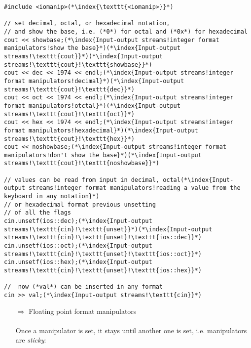 \documentclass[10pt]{article}
\begin{document}
\begin{lstlisting}
#include <iomanip>(*\index{\texttt{<iomanip>}}*)

// set decimal, octal, or hexadecimal notation,
// and show the base, i.e. (*0*) for octal and (*0x*) for hexadecimal
cout << showbase;(*\index{Input-output streams!integer format manipulators!show the base}*)(*\index{Input-output streams!\texttt{cout}}*)(*\index{Input-output streams!\texttt{cout}!\texttt{showbase}}*)
cout << dec << 1974 << endl;(*\index{Input-output streams!integer format manipulators!decimal}*)(*\index{Input-output streams!\texttt{cout}!\texttt{dec}}*)
cout << oct << 1974 << endl;(*\index{Input-output streams!integer format manipulators!otctal}*)(*\index{Input-output streams!\texttt{cout}!\texttt{oct}}*)
cout << hex << 1974 << endl;(*\index{Input-output streams!integer format manipulators!hexadecimal}*)(*\index{Input-output streams!\texttt{cout}!\texttt{hex}}*)
cout << noshowbase;(*\index{Input-output streams!integer format manipulators!don't show the base}*)(*\index{Input-output streams!\texttt{cout}!\texttt{noshowbase}}*)

// values can be read from input in decimal, octal(*\index{Input-output streams!integer format manipulators!reading a value from the keyboard in any notation}*)
// or hexadecimal format previous unsetting
// of all the flags
cin.unsetf(ios::dec);(*\index{Input-output streams!\texttt{cin}!\texttt{unset}}*)(*\index{Input-output streams!\texttt{cin}!\texttt{unset}!\texttt{ios::dec}}*)
cin.unsetf(ios::oct);(*\index{Input-output streams!\texttt{cin}!\texttt{unset}!\texttt{ios::oct}}*)
cin.unsetf(ios::hex);(*\index{Input-output streams!\texttt{cin}!\texttt{unset}!\texttt{ios::hex}}*)

//  now (*val*) can be inserted in any format
cin >> val;(*\index{Input-output streams!\texttt{cin}}*)
\end{lstlisting}
\begin{enumerate}
\item[$\Rightarrow$] Floating point format manipulators\\ \\ Once a  manipulator is set, it stays until another one is set, i.e. manipulators are \emph{sticky}:
\end{enumerate}
\end{document}
